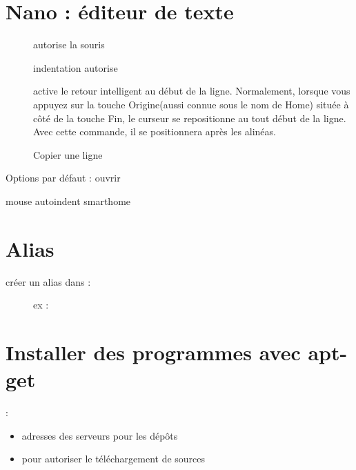 \documentclass[letterpaper,10pt,french]{sphinxmanual}
\begin{document}
\chapter{Nano : éditeur de texte}
\label{\detokenize{10-nano:nano-editeur-de-texte}}\label{\detokenize{10-nano::doc}}\begin{description}
\item[{}] \leavevmode
autorise la souris

\item[{}] \leavevmode
indentation autorise

\item[{}] \leavevmode
active le retour intelligent au début de la ligne. Normalement, lorsque vous appuyez sur la touche Origine(aussi connue sous le nom de Home) située à côté de la touche Fin, le curseur se repositionne au tout début de la ligne. Avec cette commande, il se positionnera après les alinéas.

\item[{}] \leavevmode
Copier une ligne

\end{description}

Options par défaut : ouvrir 

%
\begin{sphinxVerbatim}[commandchars=\\\{\}]
 mouse
     autoindent
     smarthome
\end{sphinxVerbatim}


\chapter{Alias}
\label{\detokenize{11-alias:alias}}\label{\detokenize{11-alias::doc}}\begin{description}
\item[{créer un alias dans  :}] \leavevmode
ex : 

\end{description}


\chapter{Installer des programmes avec apt-get}
\label{\detokenize{12-apt-get:installer-des-programmes-avec-apt-get}}\label{\detokenize{12-apt-get::doc}}
 :
\begin{itemize}
\item {} 
adresses des serveurs pour les dépôts

\item {} 
pour autoriser le téléchargement de sources

\end{itemize}
\end{document}
